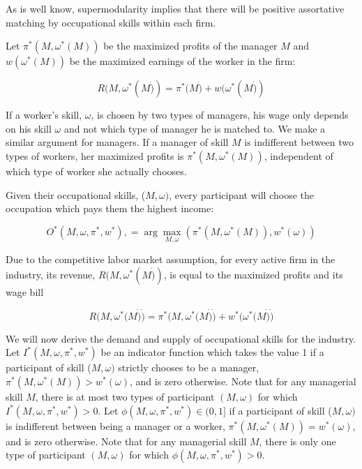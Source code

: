 \documentclass[12 pt]{article}
\begin{document}
As is well know, supermodularity implies that there will be positive
assortative matching by occupational skills within each firm.

Let $\pi^{\ast}(M,\omega^{\ast}(M))$ be the maximized profits of the manager
$M$ and $w(\omega^{\ast}(M))$ be the maximized earnings of the worker in the firm:%

\begin{equation}
	R(M,\omega^{\ast}(M\dot{)})=\pi^{\ast}(M\dot{)}+w(\omega^{\ast}(M\dot{)})
	\label{5}%
\end{equation}


If a worker's skill, $\omega$, is chosen by two types of managers, his wage
only depends on his skill $\omega$ and not which type of manager he is matched
to. We make a similar argument for managers. If a manager of skill $M$ is
indifferent between two types of workers, her maximized profits is $\pi^{\ast
}(M,\omega^{\ast}(M))$, independent of which type of worker she actually chooses.

Given their occupational skills, ($M,\omega)$, every participant will choose
the occupation which pays them the highest income:%

\begin{equation}
	O^{\ast}(M,\omega,\pi^{\ast},w^{\ast}),=\arg\max_{M,\omega}(\pi^{\ast
	}(M,\omega^{\ast}(M)),w^{\ast}(\omega)) \label{occuptional choice}%
\end{equation}


Due to the competitive labor market assumption, for every active firm in the
industry, its revenue, $R(M,\omega^{\ast}(M\dot{)})$, is equal to the
maximized profits and its wage bill%

\begin{equation}
	R(M,\omega^{\ast}(M\dot{)}\dot{)}=\pi^{\ast}(M,\omega^{\ast}(M\dot{)}\dot
	{)}+w^{\ast}(\omega^{\ast}(M\dot{)}\dot{)} \label{6}%
\end{equation}


We will now derive the demand and supply of occupational skills for the
industry. Let $I^{\ast}(M,\omega,\pi^{\ast},w^{\ast})$ be an indicator
function which takes the value 1 if a participant of skill ($M,\omega)$
strictly chooses to be a manager, $\pi^{\ast}(M,\omega^{\ast}(M))>w^{\ast
}(\omega)$, and is zero otherwise. Note that for any managerial skill $M$,
there is at most two types of participant $(M,\omega)$ for which $I^{\ast
}(M,\omega,\pi^{\ast},w^{\ast})>0$. Let $\phi(M,\omega,\pi^{\ast},w^{\ast}%
)\in(0,1]$ if a participant of skill ($M,\omega)$ is indifferent between being
a manager or a worker, $\pi^{\ast}(M,\omega^{\ast}(M))=w^{\ast}(\omega)$, and
is zero otherwise. Note that for any managerial skill $M$, there is only one
type of participant $(M,\omega)$ for which $\phi(M,\omega,\pi^{\ast},w^{\ast
})>0$.
\end{document}
